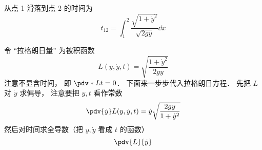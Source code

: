 

从点 1 滑落到点 2 的时间为
\begin{equation}
t_{12} = \int_1^2 \frac{\sqrt{1+\dot{y}^2}}{\sqrt{2gy}} \dd{x}
\end{equation}

令 “拉格朗日量” 为被积函数
\begin{equation}
L(y, \dot{y}, t) = \sqrt{\frac{1 + \dot{y}^2}{2gy}}
\end{equation}
注意不显含时间， 即 $\pdv*{L}{t} = 0$． 下面来一步步代入拉格朗日方程． 先把 $L$ 对 $\dot{y}$ 求偏导， 注意要把 $y, t$ 看作常数
\begin{equation}
\pdv{\dot{y}}L(y, \dot{y}, t) = \dot y\sqrt{\frac{2gy}{1+\dot{y}^2}}
\end{equation}
然后对时间求全导数（把 $y, \dot{y}$ 看成 $t$ 的函数）
\begin{equation}
\pdv{L}{\dot{y}}
\end{equation}

